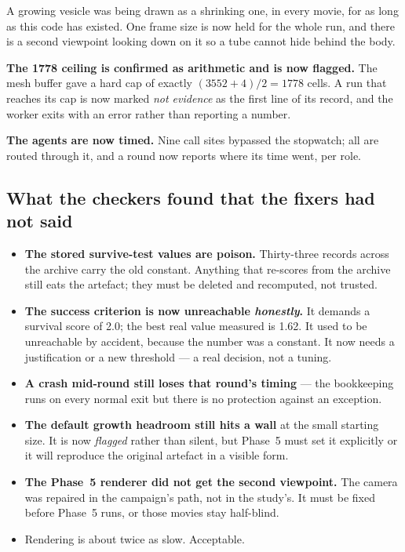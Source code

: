 \documentclass[11pt,a4paper]{article}
\begin{document}
A growing vesicle was being drawn as a shrinking one, in every movie, for as long as this code has
existed. One frame size is now held for the whole run, and there is a second viewpoint looking
down on it so a tube cannot hide behind the body.

\textbf{The 1778 ceiling is confirmed as arithmetic and is now flagged.} The mesh buffer gave a
hard cap of exactly $(3552{+}4)/2 = 1778$ cells. A run that reaches its cap is now marked
\emph{not evidence} as the first line of its record, and the worker exits with an error rather
than reporting a number.

\textbf{The agents are now timed.} Nine call sites bypassed the stopwatch; all are routed through
it, and a round now reports where its time went, per role.

\subsection{What the checkers found that the fixers had not said}

\begin{itemize}
\item \textbf{The stored survive-test values are poison.} Thirty-three records across the archive
carry the old constant. Anything that re-scores from the archive still eats the artefact; they must
be deleted and recomputed, not trusted.
\item \textbf{The success criterion is now unreachable \emph{honestly}.} It demands a survival
score of 2.0; the best real value measured is 1.62. It used to be unreachable by accident, because
the number was a constant. It now needs a justification or a new threshold --- a real decision, not
a tuning.
\item \textbf{A crash mid-round still loses that round's timing} --- the bookkeeping runs on every
normal exit but there is no protection against an exception.
\item \textbf{The default growth headroom still hits a wall} at the small starting size. It is now
\emph{flagged} rather than silent, but Phase~5 must set it explicitly or it will reproduce the
original artefact in a visible form.
\item \textbf{The Phase~5 renderer did not get the second viewpoint.} The camera was repaired in
the campaign's path, not in the study's. It must be fixed before Phase~5 runs, or those movies stay
half-blind.
\item Rendering is about twice as slow. Acceptable.
\end{itemize}
\end{document}
